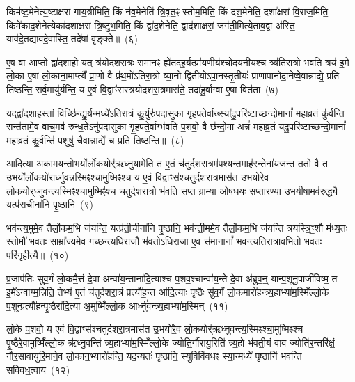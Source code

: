किम॑ष्ट॒मेनेत्य॒ष्टाक्ष॑रां गाय॒त्रीमिति॒ किं न॑व॒मेनेति॑ त्रि॒वृत॒ꣴ॒ स्तोम॒मिति॒ किं द॑श॒मेनेति॒ दशा᳚क्षरां वि॒राज॒मिति॒ किमे॑काद॒शेनेत्येका॑\-दशाक्षरां त्रि॒ष्टुभ॒मिति॒ किं द्वा॑द॒शेनेति॒ द्वाद॑शाक्षरां॒ जग॑ती॒मित्ये॒ताव॒द्वा अ॑स्ति॒ याव॑दे॒तद्याव॑दे॒वास्ति॒ तदे॑षां वृङ्क्ते॥~(६)\ip

{\anuvakamend[{शक्व॑री॒मित्येक॑चत्वारिꣳशच्च}]}

ए॒ष वा आ॒प्तो द्वा॑दशा॒हो यत् त्र॑योदशरा॒त्रः स॑मा॒नꣴ ह्ये॑तदह॒र्यत्प्रा॑य॒णीय॑श्चोदय॒नीय॑श्च॒ त्र्य॑तिरात्रो भवति॒ त्रय॑ इ॒मे लो॒का ए॒षां लो॒काना॒माप्त्यै᳚ प्रा॒णो वै प्र॑थ॒मो॑\-ऽतिरा॒त्रो व्या॒नो द्वि॒तीयो॑\-ऽपा॒नस्तृ॒तीयः॑ प्राणापानोदा॒नेष्वे॒वान्नाद्ये॒ प्रति॑ तिष्ठन्ति॒ सर्व॒मायु॑र्यन्ति॒ य ए॒वं वि॒द्वाꣳ॑सस्त्रयोदशरा॒त्रमास॑ते॒ तदा॑हु॒र्वाग्वा ए॒षा वित॑ता~(७)\ip

यद्द्वा॑दशा॒हस्तां विच्छि॑न्द्यु॒र्यन्मध्ये॑\-ऽतिरा॒त्रं कु॒र्युरु॑प॒दासु॑का गृ॒हप॑ते॒र्वाख्स्या॑दु॒परि॑ष्टाच्छन्दो॒मानां᳚ महाव्र॒तं कु॑र्वन्ति॒ सन्त॑तामे॒व वाच॒मव॑ रुन्ध॒ते\-ऽनु॑पदासुका गृ॒हप॑ते॒र्वाग्भ॑वति प॒शवो॒ वै छ॑न्दो॒मा अन्नं॑ महाव्र॒तं यदु॒परि॑ष्टाच्छन्दो॒मानां᳚ महाव्र॒तं कु॒र्वन्ति॑ प॒शुषु॑ चै॒वान्नाद्ये॑ च॒ प्रति॑ तिष्ठन्ति॥~(८)\ip

{\anuvakamend[{वित॑ता॒ त्रिच॑त्वारिꣳशच्च}]}

आ॒दि॒त्या अ॑कामयन्तो॒भयो᳚र्लो॒कयोर्॑ऋध्नुया॒मेति॒ त ए॒तं च॑तुर्दशरा॒त्रम॑पश्य॒न्तमाह॑र॒न्तेना॑यजन्त॒ ततो॒ वै त उ॒भयो᳚र्लो॒कयो॑रार्ध्नुवन्न॒स्मिꣴश्चा॒मुष्मिꣴ॑श्च॒ य ए॒वं वि॒द्वाꣳस॑श्चतुर्दशरा॒त्रमास॑त उ॒भयो॑रे॒व लो॒कयोर्॑\mbox{}॑ध्नुवन्त्य॒\-स्मिꣴश्चा॒मुष्मिꣴ॑श्च चतुर्दशरा॒त्रो भ॑वति स॒प्त ग्रा॒म्या ओष॑धयः स॒प्तार॒ण्या उ॒भयी॑षा॒मव॑रुद्ध्यै॒ यत्प॑रा॒चीना॑नि पृ॒ष्ठानि॑~(९)\ip

भव॑न्त्य॒मुमे॒व तैर्लो॒कम॒भि ज॑यन्ति॒ यत्प्र॑ती॒चीना॑नि पृ॒ष्ठानि॒ भव॑न्ती॒ममे॒व तैर्लो॒कम॒भि ज॑यन्ति त्रयस्त्रि॒ꣳ॒शौ म॑ध्य॒तः स्तोमौ॑ भवतः॒ साम्रा᳚ज्यमे॒व ग॑च्छन्त्यधिरा॒जौ भ॑वतो\-ऽधिरा॒जा ए॒व स॑मा॒नानां᳚ भवन्त्यतिरा॒त्राव॒भितो॑ भवतः॒ परि॑गृहीत्यै॥~(१०)\ip

{\anuvakamend[{पृ॒ष्ठानि॒ चतु॑स्त्रिꣳशच्च}]}

प्र॒जा\-प॑तिः सुव॒र्गं लो॒कमै॒त्तं दे॒वा अन्वा॑य॒न्ताना॑दि॒त्याश्च॑ प॒शव॒श्चान्वा॑य॒न्ते दे॒वा अ॑ब्रुव॒न्॒ यान्प॒शूनु॒पाजी॑विष्म॒ त इ॒मे᳚\-ऽन्वाग्म॒न्निति॒ तेभ्य॑ ए॒तं च॑तुर्दशरा॒त्रं प्रत्यौ॑ह॒न्त आ॑दि॒त्याः पृ॒ष्ठैः सु॑व॒र्गं लो॒कमारो॑हन्त्र्य॒हाभ्या॑म॒स्मिँल्लो॒के प॒शून्प्रत्यौ॑हन्पृ॒ष्ठैरा॑दि॒त्या अ॒मुष्मिँ॑ल्लो॒क आर्ध्नु॑वन्त्र्य॒हाभ्या॑म॒स्मिन्~(११)\ip

लो॒के प॒शवो॒ य ए॒वं वि॒द्वाꣳस॑श्चतुर्दशरा॒त्रमास॑त उ॒भयो॑रे॒व लो॒कयोर्॑ऋध्नुवन्त्य॒स्मिꣴश्चा॒मुष्मिꣴ॑श्च पृ॒ष्ठैरे॒वामुष्मिँ॑ल्लो॒क ऋ॑ध्नु॒वन्ति॑ त्र्य॒हाभ्या॑म॒स्मिँल्लो॒के ज्योति॒र्गौरायु॒रिति॑ त्र्य॒हो भ॑वती॒यं वाव ज्योति॑र॒न्तरि॑क्षं॒ गौर॒सावायु॑रि॒माने॒व लो॒कान॒भ्यारो॑हन्ति॒ यद॒न्यतः॑ पृ॒ष्ठानि॒ स्युर्विवि॑वधꣴ स्या॒न्मध्ये॑ पृ॒ष्ठानि॑ भवन्ति सविवध॒त्वाय॑~(१२)\ip


